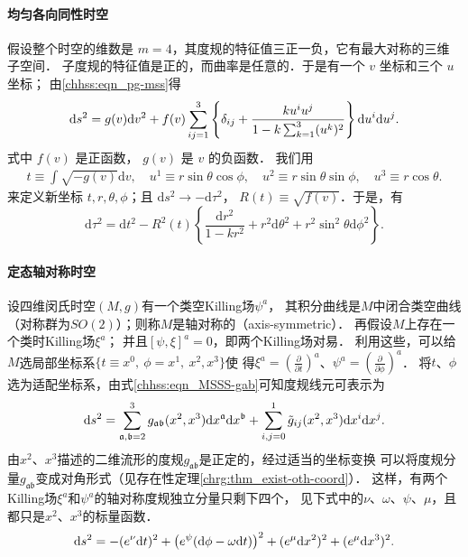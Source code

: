 
\paragraph{均匀各向同性时空}
假设整个时空的维数是 $m=4$，其度规的特征值三正一负，它有最大对称的三维子空间．
子度规的特征值是正的，而曲率是任意的．于是有一个 $v$ 坐标和三个 $u$ 坐标；
由\eqref{chhss:eqn_pg-mss}得
\begin{equation}\label{chhss:eqn_g-cos}
    \mathrm{d} s^2=g(v) \mathrm{d} v^2  +f(v) \sum_{ij=1}^{3} \left\{\delta_{ij} 
    + \frac{k u^i u^j}{1-k \sum_{k=1}^{3}(u^k)^2}\right\} {\rm d} u^i {\rm d} u^j.
\end{equation}
式中 $f(v)$ 是正函数， $g(v)$ 是 $v$ 的负函数．
我们用
\begin{align*}
    t\equiv\int \sqrt{-g(v)}\mathrm{d} v,\quad
    u^1 \equiv r \sin \theta \cos \phi, \quad
    u^2 \equiv r \sin \theta \sin \phi, \quad
    u^3 \equiv r \cos \theta .
\end{align*}
来定义新坐标 $t, r, \theta, \phi$；且 $\mathrm{d} s^2 \to -\mathrm{d} \tau^2$，
$R(t) \equiv \sqrt{f(v)}$．于是，有
\begin{equation}\label{chhss:eqn_g-cos-2}
    \mathrm{d} \tau^2=\mathrm{d} t^2-R^2(t)\left\{\frac{\mathrm{d} r^2}{1-k r^2}
    +r^2 \mathrm{d} \theta^2+r^2 \sin ^2 \theta \mathrm{d} \phi^2\right\}    .
\end{equation}


\paragraph{定态轴对称时空}\label{chhss:sec_axis-sym}

设四维闵氏时空$(M,g)$有一个类空Killing场$\psi^a$，
其积分曲线是$M$中闭合类空曲线（对称群为$SO(2)$）；则称$M$是{\heiti 轴对称的}（axis-symmetric）．
再假设$M$上存在一个类时Killing场$\xi^a$；
并且$[\psi,\xi]^a=0$，即两个Killing场对易．
利用这些，可以给$M$选局部坐标系$\{t\equiv x^0,\ \phi=x^1, \  x^2, x^3\}$使
得$\xi^a=(\frac{\partial}{\partial t})^a$、$\psi^a=(\frac{\partial}{\partial \phi})^a$．
将$t$、$\phi$选为适配坐标系，由式\eqref{chhss:eqn_MSSS-gab}可知度规线元可表示为
\begin{equation*}
    \mathrm{d} s^2= \sum_{\mathfrak{a,b}=2}^{3}
    g_{\mathfrak{ab}}(x^2,x^3) \mathrm{d} x^{\mathfrak{a}} \mathrm{d} x^{\mathfrak{b}}
    +\sum_{i,j=0}^{1} \tilde{g}_{i j}(x^2,x^3) {\rm d}x^i  {\rm d}x^j.
\end{equation*}
由$x^2$、$x^3$描述的二维流形的度规$g_{\mathfrak{ab}}$是正定的，经过适当的坐标变换
可以将度规分量$g_{\mathfrak{ab}}$变成对角形式（见存在性定理\ref{chrg:thm_exist-oth-coord}）．
这样，有两个Killing场$\xi^a$和$\psi^a$的轴对称度规独立分量只剩下四个，
见下式中的$\nu$、$\omega$、$\psi$、$\mu$，且都只是$x^2$、$x^3$的标量函数．
\begin{equation}\label{chhss:eqn_AS-metric}
    \mathrm{d} s^2= - (e^{\nu}{\rm d}t)^2 
    + \bigl(e^{\psi} ({\rm d}\phi -\omega {\rm d}t )\bigr)^2
    + (e^{\mu}{\rm d}x^2)^2 +(e^{\mu}{\rm d}x^3)^2 .
\end{equation}


